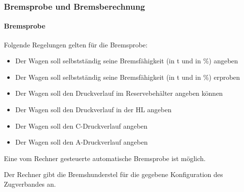 \subsubsection{Bremsprobe und Bremsberechnung}
\paragraph{Bremsprobe}
\begin{feat}
Folgende Regelungen gelten für die Bremsprobe:
\begin{itemize}
    \item Der Wagen soll selbstständig seine Bremsfähigkeit (in t und in \%) angeben
    \item Der Wagen soll selbstständig seine Bremsfähigkeit (in t und in \%) erproben
    \item Der Wagen soll den Druckverlauf im Reservebehälter angeben können
    \item Der Wagen soll den Druckverlauf in der \acrshort{HL} angeben
    \item Der Wagen soll den C-Druckverlauf angeben
    \item Der Wagen soll den A-Druckverlauf angeben
\end{itemize}
\end{feat}
\begin{feat}
Eine vom Rechner gesteuerte automatische Bremsprobe ist möglich.
\end{feat}
\begin{rem} [zu Anf. 58] 
Der Rechner gibt die Bremshunderstel für die gegebene Konfiguration des \gls{Zugverband}es an.

\end{rem}

